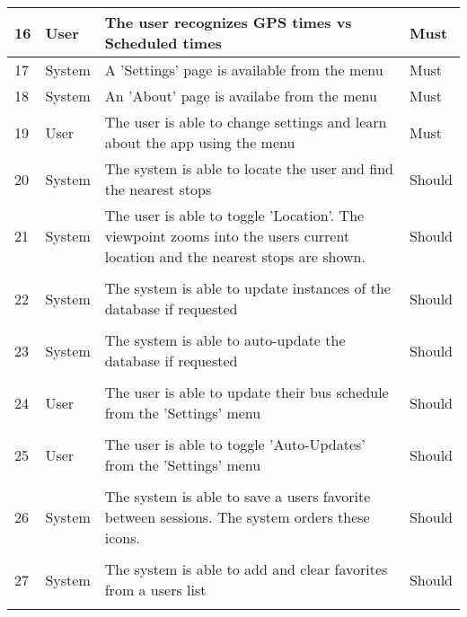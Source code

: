 \documentclass[a4paper,12pt]{article}
\begin{document}
\begin{tabular}{p{0.4cm}|p{2cm}|p{8.2cm}|p{1.7cm}}

16 & User & The user recognizes GPS times vs Scheduled times & Must \\
\hline
17 & System & A 'Settings' page is available from the menu & Must \\
\hline
18 & System & An 'About' page is availabe from the menu & Must \\
\hline
19 & User & The user is able to change settings and learn about the app using the menu & Must \\
\hline
20 & System & The system is able to locate the user and find the nearest stops & Should \\
\hline
21 & System & The user is able to toggle 'Location'. The viewpoint zooms into the users current location and the nearest stops are shown. & Should \\
\hline\\
22 & System & The system is able to update instances of the database if requested & Should \\
\hline\\
23 & System & The system is able to auto-update the database if requested & Should \\
\hline\\
24 & User & The user is able to update their bus schedule from the 'Settings' menu & Should \\
\hline\\
25 & User & The user is able to toggle 'Auto-Updates' from the 'Settings' menu & Should \\
\hline\\
26 & System & The system is able to save a users favorite between sessions. The system orders these icons. & Should \\
\hline\\
27 & System & The system is able to add and clear favorites from a users list & Should \\
\hline\\

\end{tabular}

\pagebreak
\end{document}
